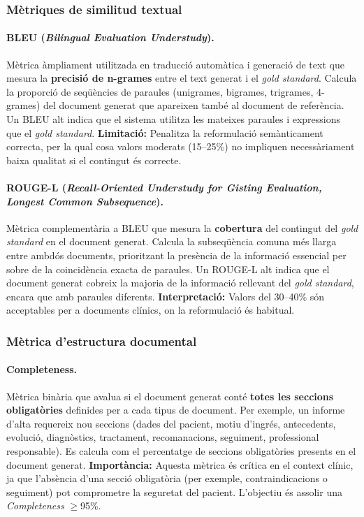 \documentclass[CAT]{TFUOC}%
\begin{document}
\subsubsection{Mètriques de similitud textual}

\paragraph{BLEU (\textit{Bilingual Evaluation Understudy}).}
Mètrica àmpliament utilitzada en traducció automàtica i generació de text que mesura la \textbf{precisió de n-grames} entre el text generat i el \textit{gold standard}. Calcula la proporció de seqüències de paraules (unigrames, bigrames, trigrames, 4-grames) del document generat que apareixen també al document de referència. Un BLEU alt indica que el sistema utilitza les mateixes paraules i expressions que el \textit{gold standard}. \textbf{Limitació:} Penalitza la reformulació semànticament correcta, per la qual cosa valors moderats (15--25\%) no impliquen necessàriament baixa qualitat si el contingut és correcte.

\paragraph{ROUGE-L (\textit{Recall-Oriented Understudy for Gisting Evaluation, Longest Common Subsequence}).}
Mètrica complementària a BLEU que mesura la \textbf{cobertura} del contingut del \textit{gold standard} en el document generat. Calcula la subseqüència comuna més llarga entre ambdós documents, prioritzant la presència de la informació essencial per sobre de la coincidència exacta de paraules. Un ROUGE-L alt indica que el document generat cobreix la majoria de la informació rellevant del \textit{gold standard}, encara que amb paraules diferents. \textbf{Interpretació:} Valors del 30--40\% són acceptables per a documents clínics, on la reformulació és habitual.

\subsubsection{Mètrica d'estructura documental}

\paragraph{Completeness.}
Mètrica binària que avalua si el document generat conté \textbf{totes les seccions obligatòries} definides per a cada tipus de document. Per exemple, un informe d'alta requereix nou seccions (dades del pacient, motiu d'ingrés, antecedents, evolució, diagnòstics, tractament, recomanacions, seguiment, professional responsable). Es calcula com el percentatge de seccions obligatòries presents en el document generat. \textbf{Importància:} Aquesta mètrica és crítica en el context clínic, ja que l'absència d'una secció obligatòria (per exemple, contraindicacions o seguiment) pot comprometre la seguretat del pacient. L'objectiu és assolir una \textit{Completeness} $\geq$95\%.
\end{document}

